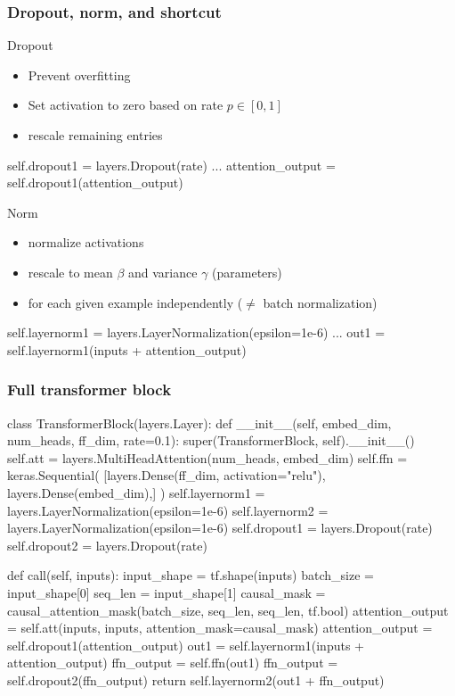 \documentclass[17pt,institute=e10]{tuhh_presentation}
\begin{document}
\begin{frame}[fragile]
  \frametitle{Dropout, norm, and shortcut}
  \vspace{-1cm}
  \begin{block}{Dropout}
    \begin{itemize}
      \item Prevent overfitting
      \item Set activation to zero based on rate $p \in [0,1]$
      \item rescale remaining entries
    \end{itemize} 
    \vspace{0.5cm}
    \begin{python}
    self.dropout1 = layers.Dropout(rate)
    ...
    attention_output = self.dropout1(attention_output)
    \end{python}
  \end{block}
  \pause
  \begin{block}{Norm}
    \begin{itemize}
      \item normalize activations
      \item rescale to mean $\beta$ and variance $\gamma$ (parameters)
      \item for each given example independently ($\neq$ batch normalization)
    \end{itemize}
    \vspace{0.5cm}
    \begin{python}
    self.layernorm1 = layers.LayerNormalization(epsilon=1e-6)
    ...
    out1 = self.layernorm1(inputs + attention_output)
    \end{python}
  \end{block}
\end{frame}

\begin{frame}[fragile]
  \frametitle{Full transformer block}
\begin{python}
  class TransformerBlock(layers.Layer):
    def __init__(self, embed_dim, num_heads, ff_dim, rate=0.1):
        super(TransformerBlock, self).__init__()
        self.att = layers.MultiHeadAttention(num_heads, embed_dim)
        self.ffn = keras.Sequential(
            [layers.Dense(ff_dim, activation="relu"), layers.Dense(embed_dim),]
        )
        self.layernorm1 = layers.LayerNormalization(epsilon=1e-6)
        self.layernorm2 = layers.LayerNormalization(epsilon=1e-6)
        self.dropout1 = layers.Dropout(rate)
        self.dropout2 = layers.Dropout(rate)

    def call(self, inputs):
        input_shape = tf.shape(inputs)
        batch_size = input_shape[0]
        seq_len = input_shape[1]
        causal_mask = causal_attention_mask(batch_size, seq_len, seq_len, tf.bool)
        attention_output = self.att(inputs, inputs, attention_mask=causal_mask)
        attention_output = self.dropout1(attention_output)
        out1 = self.layernorm1(inputs + attention_output)
        ffn_output = self.ffn(out1)
        ffn_output = self.dropout2(ffn_output)
        return self.layernorm2(out1 + ffn_output)
\end{python}
\end{frame}
\end{document}
